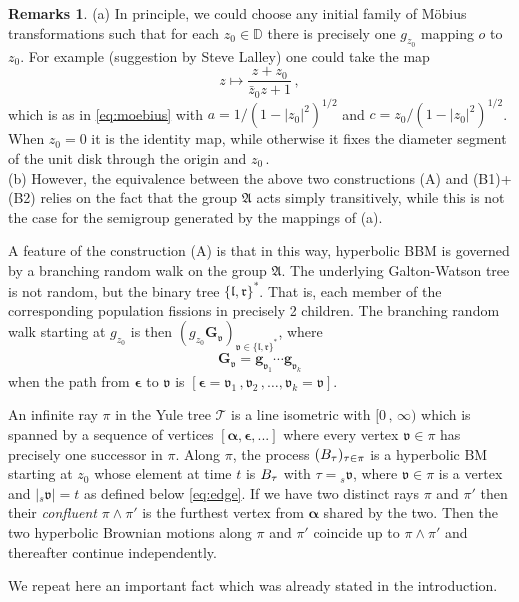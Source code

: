 \documentclass[12pt]{amsart}
\newcommand\Aff{\mathfrak A}
\newcommand\bal{\boldsymbol{\alpha}}
\newcommand\bep{\boldsymbol{\epsilon}}
\newcommand\BB{\textit{\textbf{B}}}
\newcommand\DD{\mathbb D}
\newcommand\gb{\mathbf{g}}
\newcommand\Gb{\mathbf{G}}
\newcommand\gm{g}
\newcommand\lt{\mathfrak{l}}
\newcommand\rt{\mathfrak{r}}
\newcommand\T{\mathcal T}
\newcommand\vt{\mathfrak{v}}
\numberwithin{theorem}{section}
\theoremstyle{definition}
\newtheorem{rems}[theorem]{Remarks}
\begin{document}
\begin{rems} (a) In principle, we could choose any initial family of M\"obius transformations
such that for each $z_0 \in\DD$ there is precisely one $g_{z_0}$ mapping $o$ to $z_0$.  
For example (suggestion by Steve Lalley) one could take the map
$$
z \mapsto \frac{z + z_0}{\bar z_0z + 1}\,,
$$
which is as in \eqref{eq:moebius} with $a= 1/(1-|z_0|^2)^{1/2}$ and $c = z_0/(1-|z_0|^2)^{1/2}$.
When $z_0=0$ it is the identity map, while otherwise it fixes the 
diameter segment of the unit disk through the origin and $z_0\,$.
\\[3pt]
(b) However, the equivalence between the above two constructions (A) and (B1)+(B2) relies on the 
fact that the group $\Aff$ acts simply transitively, while this is not the case for the semigroup
generated by the mappings of (a).

\smallskip

A feature of the construction (A) is that in this way, hyperbolic BBM is governed by 
a branching random walk on the group $\Aff$. The underlying Galton-Watson tree is not random,
but the binary tree $\{\lt,\rt\}^*$. That is, each member of the corresponding population
fissions in precisely 2 children. The branching random walk starting at $g_{z_0}$ is then 
$(\gm_{z_0}\Gb_{\vt})_{\vt \in \{\lt,\rt\}^*}$, where 
\begin{equation}\label{eq:Gv}
\Gb_{\vt} =\gb_{\vt_1}\cdots\gb_{\vt_{k}}
\end{equation}
when the path from $\bep$ to $\vt$ is $[\bep = \vt_1\,, \vt_2\,,\dots, \vt_k = \vt]$. 
\end{rems}


An infinite ray $\pi$ in the Yule tree $\T$ is a line isometric with  $[0\,,\,\infty)$ 
which is spanned by a sequence of 
vertices $[\bal, \bep, ...]$ where every vertex $\vt \in \pi$ has precisely one
successor in $\pi$. Along $\pi$, the process $(\BB_{\tau})_{\tau \in \pi}$ is 
a hyperbolic BM starting at $z_0$ whose element at time $t$ is $\BB_{\tau}$ with 
$\tau = {{_s}\vt}$, where $\vt\in\pi$ is a 
vertex and $|{{_s}\vt}| = t$ as defined below \eqref{eq:edge}.
If we have two distinct rays $\pi$ and $\pi'$ then their \emph{confluent}
$\pi \wedge \pi'$ is the furthest vertex from $\bal$ shared by the two. 
Then the two hyperbolic Brownian motions along $\pi$ and $\pi'$ coincide up
to $\pi \wedge \pi'$ and thereafter continue independently. 

We repeat here an important fact which was already stated in the introduction.
\end{document}
